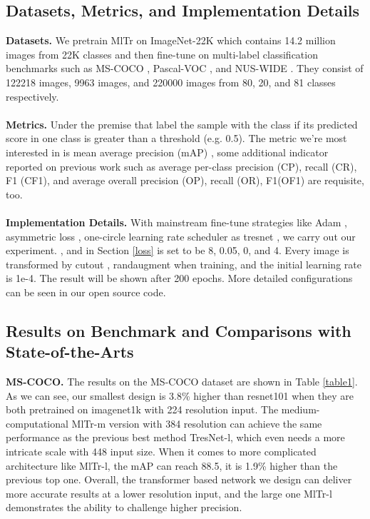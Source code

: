 \documentclass{article} \usepackage[numbers,sort&compress]{natbib}
\begin{document}
\subsection{Datasets, Metrics, and Implementation Details}
\textbf{Datasets.} We pretrain MlTr on ImageNet-22K \cite{deng2009imagenet} which contains 14.2 million images from 22K classes and then fine-tune on multi-label classification benchmarks such as MS-COCO \cite{lin2014microsoft}, Pascal-VOC \cite{everingham2010pascal}, and NUS-WIDE \cite{chua2009nus}. They consist of 122218 images, 9963 images, and 220000 images from 80, 20, and 81 classes respectively. \\\\
\textbf{Metrics.} Under the premise that label the sample with the class if its predicted score in one class is greater than a threshold  (e.g. 0.5). The metric we're most interested in is mean average precision (mAP) \cite{chen2019multi}, some additional indicator reported on previous work such as average per-class precision (CP), recall (CR), F1 (CF1), and average overall precision (OP), recall (OR), F1(OF1) are requisite, too.\\\\
\textbf{Implementation Details.} With mainstream fine-tune strategies like Adam \cite{loshchilov2017decoupled}, asymmetric loss \cite{ben2020asymmetric}, one-circle \cite{smith2018disciplined} learning rate scheduler as tresnet \cite{ridnik2021tresnet}, we carry out our experiment. , and  in Section \ref{loss} is set to be 8, 0.05, 0, and 4. Every image is transformed by cutout \cite{devries2017improved}, randaugment when training, and the initial learning rate is 1e-4. The result will be shown after 200 epochs. More detailed configurations can be seen in our open source code.


\subsection{Results on Benchmark and Comparisons with State-of-the-Arts}
\textbf{MS-COCO.} 
The results on the MS-COCO dataset are shown in Table \textcolor{red}{\ref{table1}}. As we can see, our smallest design is 3.8\% higher than resnet101 \cite{he2016deep} when they are both pretrained on imagenet1k with 224 resolution input. The medium-computational MlTr-m version with 384 resolution can achieve the same performance as the previous best method TresNet-l, which even needs a more intricate scale with 448 input size. When it comes to more complicated architecture like MlTr-l, the mAP can reach 88.5, it is 1.9\% higher than the previous top one. Overall, the transformer based network we design can deliver more accurate results at a lower resolution input, and the large one MlTr-l demonstrates the ability to challenge higher precision.
\end{document}
